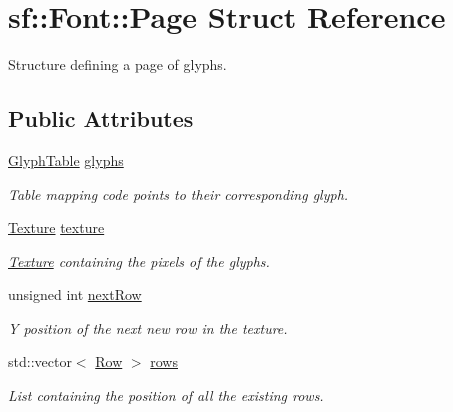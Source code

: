 \hypertarget{structsf_1_1_font_1_1_page}{}\section{sf\+:\+:Font\+:\+:Page Struct Reference}
\label{structsf_1_1_font_1_1_page}


Structure defining a page of glyphs.  


\subsection*{Public Attributes}
\begin{DoxyCompactItemize}
\item 
\mbox{\label{structsf_1_1_font_1_1_page_aa18080b87d7485ead1d4a03b97a76a14}} 
\mbox{\hyperlink{classsf_1_1_font_a952841b9f01447562e2cd9c6e41d3a58}{Glyph\+Table}} \mbox{\hyperlink{structsf_1_1_font_1_1_page_aa18080b87d7485ead1d4a03b97a76a14}{glyphs}}
\begin{DoxyCompactList}\small\item\em Table mapping code points to their corresponding glyph. \end{DoxyCompactList}\item 
\mbox{\label{structsf_1_1_font_1_1_page_a8225fe677a1759c3b3995af8a11ac3bf}} 
\mbox{\hyperlink{classsf_1_1_texture}{Texture}} \mbox{\hyperlink{structsf_1_1_font_1_1_page_a8225fe677a1759c3b3995af8a11ac3bf}{texture}}
\begin{DoxyCompactList}\small\item\em \mbox{\hyperlink{classsf_1_1_texture}{Texture}} containing the pixels of the glyphs. \end{DoxyCompactList}\item 
\mbox{\label{structsf_1_1_font_1_1_page_a936ba5f21d0b3e22d34bc00231fb6cfa}} 
unsigned int \mbox{\hyperlink{structsf_1_1_font_1_1_page_a936ba5f21d0b3e22d34bc00231fb6cfa}{next\+Row}}
\begin{DoxyCompactList}\small\item\em Y position of the next new row in the texture. \end{DoxyCompactList}\item 
\mbox{\label{structsf_1_1_font_1_1_page_a85c391fe41dba5f50cc5d80116e3a2fe}} 
std\+::vector$<$ \mbox{\hyperlink{structsf_1_1_font_1_1_row}{Row}} $>$ \mbox{\hyperlink{structsf_1_1_font_1_1_page_a85c391fe41dba5f50cc5d80116e3a2fe}{rows}}
\begin{DoxyCompactList}\small\item\em List containing the position of all the existing rows. \end{DoxyCompactList}\end{DoxyCompactItemize}


